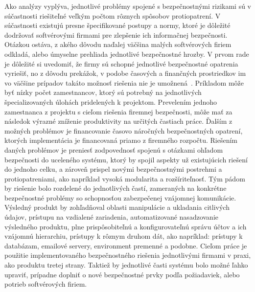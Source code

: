 Ako analýzy vyplýva, jednotlivé problémy spojené s bezpečnostnými rizikami sú v súčastnosti riešiteľné veľkým počtom
rôznych spôsobov protiopatrení.
V súčastnosti existujú presne špecifikované postupy a normy, ktoré je dôležité dodržovať softvérovými firmami pre zlepšenie
ich informačnej bezpečnosti.
Otázkou ostáva, z akého dôvodu naďalej väčšina malých softvérových firiem odkladá, alebo úmyselne prehliada jednotlivé bezpečnostné hrozby.
V prvom rade je dôležité si uvedomiť, že firmy sú schopné jednotlivé bezpečnostné opatrenia vyriešiť, no z dôvodu
prekážok, v podobe časových a finančných prostriedkov im vo väčšine prípadov takáto možnosť riešenia nie je umožnená~\cite{CompanySecurity}.
Príkladom môže byť nízky počet zamestnancov, ktorý sú potrebný na jednotlivých špecializovaných úlohách pridelených k projektom.
Prevelením jednoho zamestnanca z projektu s cieľom riešenia firemnej bezpečnosti, môže mať za následok výrazné zníženie
produktivity na určitých častiach práce.
Ďalším z možných problémov je financovanie časovo náročných bezpečnostných opatrení, ktorých implementácia je financovaná
priamo z firemného rozpočtu.
Riešením daných problémov je preniesť zodpovednosť spojenú s otázkami ohľadom bezpečnosti do uceleného systému, ktorý by
spojil aspekty už existujúcich riešení do jednoho celku, a zároveň prispel novými bezpečnostnými postrehmi a protiopatreniami,
ako napríklad vysoká modularita a rozšíriteľnosť.
Tým pádom by riešenie bolo rozdelené do jednotlivých častí, zameraných na konkrétne bezpečnostné problémy so schopnosťou
zabezpečenej vzájomnej komunikácie.
Výsledný produkt by zohľadňoval oblasti manipulácie a ukladania citlivých údajov, prístupu na vzdialené zariadenia,
automatizované nasadzovanie výsledného produktu, plne prispôsobiteľnú a konfigurovateľnú správu účtov a ich vzájomnú
hierarchiu, prístupy k rôznym druhom dát, ako napríklad: prístupy k databázam, emailové servery, environment premenné a
podobne.
Cieľom práce je použitie implementovaného bezpečnostného riešenia jednotlivými firmami v praxi, ako produktu tretej strany.
Taktiež by jednotlivé časti systému bolo možné ľahko upraviť, prípadne doplniť o nové bezpečnostné prvky podľa požiadaviek, alebo
potrieb softvérových firiem.
